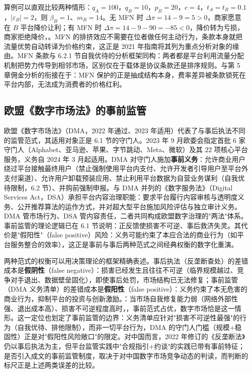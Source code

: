 算例可以直观比较两种情形：$q_A = 100$，$q_B = 10$，$p_B = 20$，$c = 4$，$t_A = t_B = 0.1$，$|\varepsilon_B| = 2$，则 $\beta_B = 1$、$m_B = 14$。无 MFN 时 $\Delta\pi = 14 - 9 = 5 > 0$，商家愿意在 $B$ 平台降价让利；有 MFN 时 $\Delta\pi = 14 - 9 - 90 = -85 < 0$，降价转为亏损，商家拒绝降价，。MFN 的排挤效应不需要在位者做任何主动行为，条款本身就把流量优势自动转译为价格约束，这正是 2021 年指南将其列为重点分析对象的缘由。MFN 条款与 6.2.1 节自我优待的分析框架同构：两者都是平台利用流量分配机制把势力传导到相邻市场，区别仅在于载体是协议条款还是排序规则。与第 5 章佣金分析的衔接在于：MFN 保护的正是抽成结构本身，费率差异被条款锁死在平台内部，无法成为消费者的价格红利。

\subsection{欧盟《数字市场法》的事前监管}

欧盟《数字市场法》（DMA，2022 年通过、2023 年适用）代表了与事后执法不同的监管范式，其适用对象正是 6.1 节的守门人。2023 年 9 月欧委会指定首批 6 家守门人（Alphabet、亚马逊、苹果、字节跳动、Meta、微软）及其 22 项核心平台服务，义务自 2024 年 3 月起适用。DMA 对守门人施加\textbf{事前义务}：允许商业用户绕过平台接触最终用户（禁止强制使用平台内支付、允许开发者引导用户至平台外支付渠道）、允许用户卸载预装应用、禁止利用平台数据为自营业务谋利（自我优待限制，6.2 节）、并购前强制申报。与 DMA 并列的《数字服务法》（Digital Services Act，DSA）承担平台内容治理职能：要求平台履行内容审核与透明度义务、公开推荐算法的运作方式，并对超大型平台施加风险评估与独立审计义务。DMA 管市场行为、DSA 管内容责任，二者共同构成欧盟数字治理的"两法"体系。事前监管的理论逻辑已在 6.1 节说明：正反馈使损害不可逆、事后救济失灵。其代价是"假阳性"（false positive）风险：义务可能约束了本应合法的商业行为（如平台服务整合的效率），这正是事前与事后两种范式之间经典权衡的数字化重演。

两种范式的权衡可以用决策理论的框架精确表述。事后执法（反垄断查处）的差错成本是\textbf{假阴性}（false negative）：损害已经发生且往往不可逆（临界规模越过、竞争对手退出、数据壁垒固化），即使事后处罚，市场结构已无法修复；事前监管（DMA 义务清单）的差错成本是\textbf{假阳性}（false positive）：义务约束了本无危害的商业行为，抑制平台的投资与创新激励。：当市场自我修复能力弱（网络外部性强、退出成本高）、损害不可逆程度高时，，事前范式占优，数字市场恰是这一情形。这一定位也划定了事前监管的边界：义务清单应针对"损害不可逆性最强"的行为（自我优待、排他限制），而非一切平台行为，DMA 的守门人门槛（规模+稳固性）正是对"假阳性风险敞口"的限定。对中国而言，2022 年修订的《反垄断法》仍以事后执法为主，但平台监管实践中"合规指引+约谈"的实践已带有事前特征；是否引入成文的事前监管制度，取决于对中国数字市场竞争动态的判读，而判断的标尺正是上述两类误差的比较。

